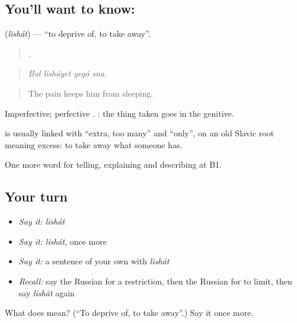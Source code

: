 \subsection*{You'll want to know: }
\textbf{} (\emph{lishát}) — \textquotedblleft{}to deprive of, to take away\textquotedblright{}.

\begin{quote}
   .
\end{quote}

\begin{quote}
\emph{Bol lisháyet yegó sna.}
\end{quote}

\begin{quote}
The pain keeps him from sleeping.
\end{quote}

Imperfective; perfective \emph{}. \emph{  }: the thing taken goes in the genitive.

\begin{cousinweb}
\textbf{} is usually linked with \emph{} \textquotedblleft{}extra, too many\textquotedblright{} and \emph{} \textquotedblleft{}only\textquotedblright{}, on an old Slavic root meaning excess: to take away what someone has.
\end{cousinweb}

\begin{grammarlens}[title={What you've built}]
One more word for telling, explaining and describing at B1.
\end{grammarlens}

\subsection*{Your turn}
\begin{itemize}
\raggedright
  \item \emph{Say it:} \emph{lishát}
  \item \emph{Say it:} \emph{lishát}, once more
  \item \emph{Say it:} a sentence of your own with \emph{lishát}
  \item \emph{Recall:} say the Russian for a restriction, then the Russian for to limit, then say \emph{lishát} again
\end{itemize}

\begin{tcolorbox}[breakable,colback=teal!4,colframe=teal!35!black,title={Before you move on}]
What does  mean? (\textquotedblleft{}To deprive of, to take away\textquotedblright{}.) Say it once more.
\end{tcolorbox}
